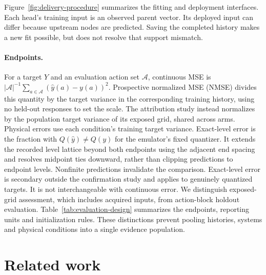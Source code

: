 Figure~\ref{fig:delivery-procedure} summarizes the fitting and deployment
interfaces. Each head's training input is an observed parent vector. Its deployed
input can differ because upstream nodes are predicted. Saving the completed
history makes a new fit possible, but does not resolve that support mismatch.


\paragraph{Endpoints.}
For a target $Y$ and an evaluation action set $\mathcal A$, continuous MSE is
$|\mathcal A|^{-1}\sum_{a\in\mathcal A}(\hat y(a)-y(a))^2$.
Prospective normalized MSE (NMSE) divides this quantity by the target variance
in the corresponding training history, using no held-out responses to set the
scale. The attribution study instead normalizes by the population target variance
of its exposed grid, shared across arms. Physical errors use each condition's
training target variance. Exact-level error is the fraction with
$Q(\hat y)\ne Q(y)$ for the emulator's fixed quantizer. It extends the recorded
level lattice beyond both endpoints using the adjacent end spacing and resolves
midpoint ties downward, rather than clipping predictions to endpoint levels.
Nonfinite predictions invalidate the comparison.
Exact-level error is secondary outside the confirmation study and applies
to genuinely quantized targets. It is not interchangeable with continuous error. We distinguish
exposed-grid assessment, which includes acquired inputs, from action-block
holdout evaluation. Table~\ref{tab:evaluation-design} summarizes the endpoints,
reporting units and initialization rules. These distinctions prevent pooling
histories, systems and physical conditions into a single evidence population.


\section{Related work}
\label{sec:related}

